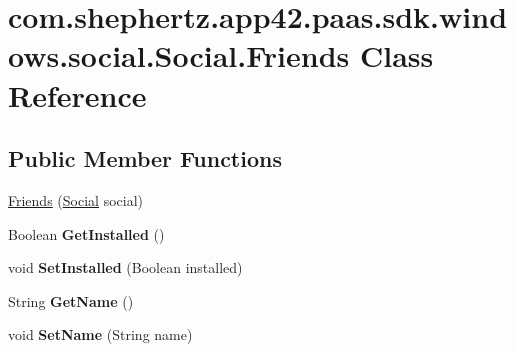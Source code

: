 \hypertarget{classcom_1_1shephertz_1_1app42_1_1paas_1_1sdk_1_1windows_1_1social_1_1_social_1_1_friends}{\section{com.\+shephertz.\+app42.\+paas.\+sdk.\+windows.\+social.\+Social.\+Friends Class Reference}
\label{classcom_1_1shephertz_1_1app42_1_1paas_1_1sdk_1_1windows_1_1social_1_1_social_1_1_friends}
}
\subsection*{Public Member Functions}
\begin{DoxyCompactItemize}
\item 
\hyperlink{classcom_1_1shephertz_1_1app42_1_1paas_1_1sdk_1_1windows_1_1social_1_1_social_1_1_friends_ab1f153492baebbb9d8391f002b0480d5}{Friends} (\hyperlink{classcom_1_1shephertz_1_1app42_1_1paas_1_1sdk_1_1windows_1_1social_1_1_social}{Social} social)
\item 
\hypertarget{classcom_1_1shephertz_1_1app42_1_1paas_1_1sdk_1_1windows_1_1social_1_1_social_1_1_friends_ac15f1eaab2cc03321cced719da31f145}{Boolean {\bfseries Get\+Installed} ()}\label{classcom_1_1shephertz_1_1app42_1_1paas_1_1sdk_1_1windows_1_1social_1_1_social_1_1_friends_ac15f1eaab2cc03321cced719da31f145}

\item 
\hypertarget{classcom_1_1shephertz_1_1app42_1_1paas_1_1sdk_1_1windows_1_1social_1_1_social_1_1_friends_a2cbcde9c0970a0b916f39a1322675f40}{void {\bfseries Set\+Installed} (Boolean installed)}\label{classcom_1_1shephertz_1_1app42_1_1paas_1_1sdk_1_1windows_1_1social_1_1_social_1_1_friends_a2cbcde9c0970a0b916f39a1322675f40}

\item 
\hypertarget{classcom_1_1shephertz_1_1app42_1_1paas_1_1sdk_1_1windows_1_1social_1_1_social_1_1_friends_ac3189a822759d5880e167ca45a9d49a1}{String {\bfseries Get\+Name} ()}\label{classcom_1_1shephertz_1_1app42_1_1paas_1_1sdk_1_1windows_1_1social_1_1_social_1_1_friends_ac3189a822759d5880e167ca45a9d49a1}

\item 
\hypertarget{classcom_1_1shephertz_1_1app42_1_1paas_1_1sdk_1_1windows_1_1social_1_1_social_1_1_friends_a9d24c4e142f9c98f81d5993927c9e03c}{void {\bfseries Set\+Name} (String name)}\label{classcom_1_1shephertz_1_1app42_1_1paas_1_1sdk_1_1windows_1_1social_1_1_social_1_1_friends_a9d24c4e142f9c98f81d5993927c9e03c}


\end{DoxyCompactItemize}
